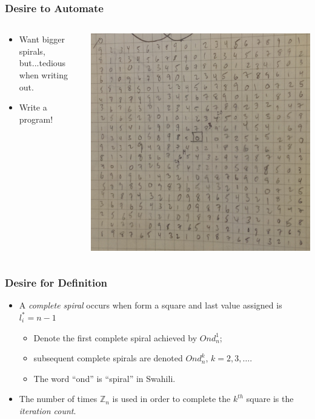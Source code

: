 \documentclass{beamer}
\theoremstyle{mydef}
\begin{document}
\frame
{
  \frametitle{Desire to Automate}

  \begin{columns}
    \begin{column}{.5\textwidth}
     \begin{block}{
     
     \color{black}
  \begin{itemize}
       \color{black}

  \item Want bigger spirals, but...tedious when writing out.
  \item Write a program!
    \end{itemize} 
}
    \end{block}
    \end{column}
    \begin{column}{.5\textwidth}
    \begin{block}{}
\includegraphics[scale=.13]{images/bigmod10.png}
    \end{block}
    \end{column}
  \end{columns}
  }


\frame
{
\frametitle{Desire for Definition}

\begin{itemize} 
\item A \emph{complete spiral} occurs when form a square and last value assigned is $l^*_i = n-1$
\begin{itemize}
\item Denote the first complete spiral achieved by $Ond^1_n$; 
\item subsequent complete spirals are denoted $Ond^k_n$, $k = 2,3,\dots$.  
\item  The word ``ond'' is ``spiral'' in Swahili.
\end{itemize}
\item The number of times $\mathbb{Z}_n$ is used in order to complete the $k^{th}$ square is the \emph{iteration count}. 
\end{itemize}
}
\end{document}
